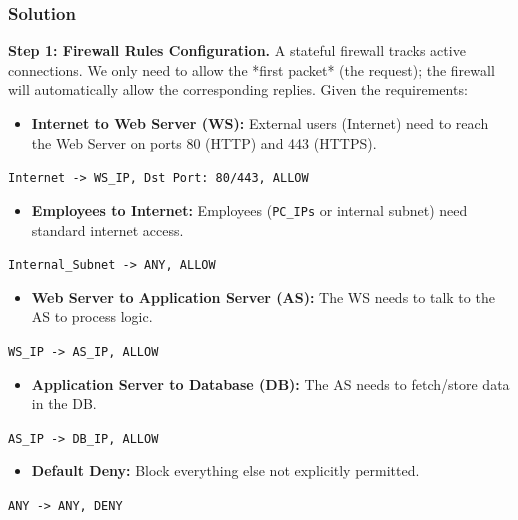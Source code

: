 \documentclass{article}
\begin{document}
\subsubsection*{Solution}
\textbf{Step 1: Firewall Rules Configuration.}
A stateful firewall tracks active connections. We only need to allow the *first packet* (the request); the firewall will automatically allow the corresponding replies.
Given the requirements:
\begin{itemize}
    \item[\textbf{1.}] \textbf{Internet to Web Server (WS):} External users (Internet) need to reach the Web Server on ports 80 (HTTP) and 443 (HTTPS).
\end{itemize}
\texttt{Internet -> WS\_IP, Dst Port: 80/443, ALLOW}
\begin{itemize}
    \item[\textbf{2.}] \textbf{Employees to Internet:} Employees (\texttt{PC\_IPs} or internal subnet) need standard internet access.
\end{itemize}
\texttt{Internal\_Subnet -> ANY, ALLOW}
\begin{itemize}
    \item[\textbf{3.}] \textbf{Web Server to Application Server (AS):} The WS needs to talk to the AS to process logic.
\end{itemize}
\texttt{WS\_IP -> AS\_IP, ALLOW}
\begin{itemize}
    \item[\textbf{4.}] \textbf{Application Server to Database (DB):} The AS needs to fetch/store data in the DB.
\end{itemize}
\texttt{AS\_IP -> DB\_IP, ALLOW}
\begin{itemize}
    \item[\textbf{5.}] \textbf{Default Deny:} Block everything else not explicitly permitted.
\end{itemize}
\texttt{ANY -> ANY, DENY}
\end{document}
